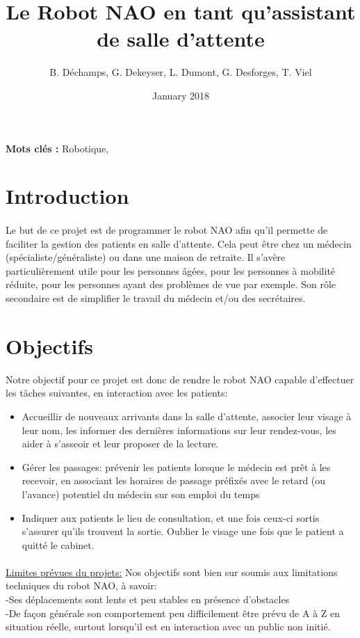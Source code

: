 \documentclass{article}
\title{Le Robot NAO en tant qu’assistant de salle d’attente}
\author{B. Déchamps, G. Dekeyser, L. Dumont, G. Desforges, T. Viel}
\date{January 2018}
\begin{document}
\maketitle

\textbf{Mots clés :} Robotique, 
\section{Introduction}

\paragraph{} Le but de ce projet est de programmer le robot NAO afin qu'il permette de faciliter la gestion des patients en salle d’attente. Cela peut être chez un médecin (spécialiste/généraliste) ou dans une maison de retraite. Il s'avère particulièrement utile pour les personnes âgées, pour les personnes à mobilité réduite, pour les personnes ayant des problèmes de vue par exemple.
Son rôle secondaire est de simplifier le travail du médecin et/ou des secrétaires.


\section{Objectifs}
Notre objectif pour ce projet est donc de rendre le robot NAO capable d'effectuer les tâches suivantes, en interaction avec les patients:
\begin{itemize}
    \item Accueillir de nouveaux arrivants dans la salle d'attente, associer leur visage à leur nom, les informer des dernières informations sur leur rendez-vous, les aider à s'asseoir et leur proposer de la lecture.
    \item Gérer les passages: prévenir les patients lorsque le médecin est prêt à les recevoir, en associant les horaires de passage préfixés avec le retard (ou l'avance) potentiel du médecin sur son emploi du temps
    \item Indiquer aux patients le lieu de consultation, et une fois ceux-ci sortis s'assurer qu'ils trouvent la sortie. Oublier le visage une fois que le patient a quitté le cabinet.
\end{itemize}
\paragraph{}\underline{Limites prévues du projets:} Nos objectifs sont bien sur soumis aux limitations techniques du robot NAO, à savoir: \\
-Ses déplacements sont lents et peu stables en présence d'obstacles \\
-De façon générale son comportement peu difficilement être prévu de A à Z en situation réelle, surtout lorsqu'il est en interaction avec un public non initié.
\end{document}
